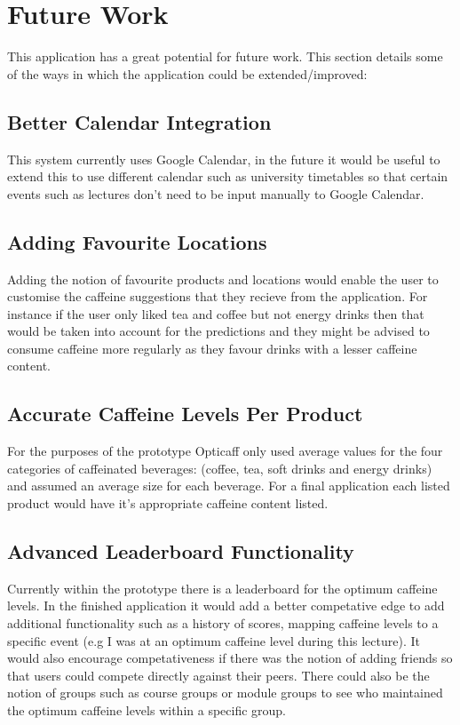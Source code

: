 \section{Future Work}

This application has a great potential for future work. This section details some of the ways in which the application could be extended/improved:

\subsection{Better Calendar Integration}
This system currently uses Google Calendar, in the future it would be useful to extend this to use different calendar such as university timetables so that certain events such as lectures don't need to be input manually to Google Calendar. 

\subsection{Adding Favourite Locations}
Adding the notion of favourite products and locations would enable the user to customise the caffeine suggestions that they recieve from the application. For instance if the user only liked tea and coffee but not energy drinks then that would be taken into account for the predictions and they might be advised to consume caffeine more regularly as they favour drinks with a lesser caffeine content. 

\subsection{Accurate Caffeine Levels Per Product}
For the purposes of the prototype Opticaff only used average values for the four categories of caffeinated beverages: (coffee, tea, soft drinks and energy drinks) and assumed an average size for each beverage. For a final application each listed product would have it's appropriate caffeine content listed. 

\subsection{Advanced Leaderboard Functionality}
Currently within the prototype there is a leaderboard for the optimum caffeine levels. In the finished application it would add a better competative edge to add additional functionality such as a history of scores, mapping caffeine levels to a specific event (e.g I was at an optimum caffeine level during this lecture). It would also encourage competativeness if there was the notion of adding friends so that users could compete directly against their peers. There could also be the notion of groups such as course groups or module groups to see who maintained the optimum caffeine levels within a specific group. 

